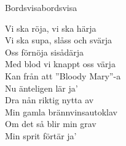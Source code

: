 \begin{song}{Bordsvisa}{bordsvisa}
\begin{vers}
Vi ska röja, vi ska härja\\
Vi ska supa, slåss och svärja\\
Oss förnöja sisådärja\\
Med blod vi knappt oss värja\\
Kan från att ''Bloody Mary''-a\\
Nu änteligen lär ja'\\
Dra nån riktig nytta av \\
Min gamla brännvinsautoklav\\
Om det så blir min grav\\
Min sprit förtär ja'\\
\end{vers}
\end{song}

